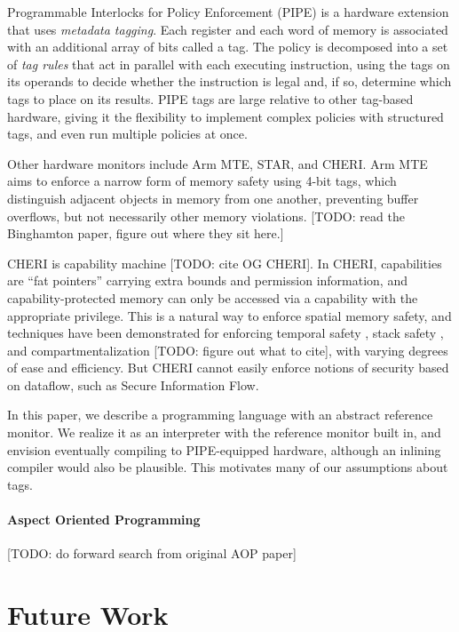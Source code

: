 \documentclass{llncs}
\begin{document}
Programmable Interlocks for Policy Enforcement (PIPE) \cite{Dhawan14:PUMP} is a hardware extension
that uses {\em metadata tagging}. Each register and each word of memory is associated with
an additional array of bits called a tag. The policy is decomposed into a set of {\em tag rules}
that act in parallel with each executing instruction, using the tags on its operands to
decide whether the instruction is legal and, if so, determine which tags to place on its results.
PIPE tags are large relative to other tag-based hardware, giving it the flexibility
to implement complex policies with structured tags, and even run multiple policies at once.

Other hardware monitors include Arm MTE, STAR, and CHERI.
Arm MTE aims to enforce a narrow form of memory safety using 4-bit tags, which distinguish adjacent objects
in memory from one another, preventing buffer overflows, but not necessarily other memory violations.
[TODO: read the Binghamton paper, figure out where they sit here.] 

CHERI is capability machine [TODO: cite OG CHERI]. In CHERI, capabilities
are ``fat pointers'' carrying extra bounds and permission information, and capability-protected
memory can only be accessed via a capability with the appropriate privilege. This is a natural
way to enforce spatial memory safety, and techniques have been demonstrated for enforcing
temporal safety \cite{NWF20:Cornucopia}, stack safety \cite{Skorstengaard19:stktokens},
and compartmentalization [TODO: figure out what to cite], with varying degrees of ease and
efficiency. But CHERI cannot easily enforce notions of security based on dataflow,
such as Secure Information Flow.

In this paper, we describe a programming language with an abstract reference monitor.
We realize it as an interpreter with the reference monitor built in, and envision
eventually compiling to PIPE-equipped hardware, although an inlining compiler would also be plausible.
This motivates many of our assumptions about tags.

\paragraph{Aspect Oriented Programming}

[TODO: do forward search from original AOP paper]

\section{Future Work}
\label{sec:futurework}
\end{document}

